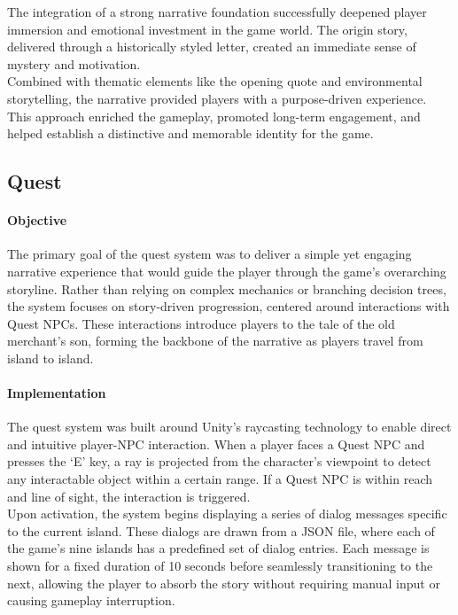 \documentclass{article}
\begin{document}
The integration of a strong narrative foundation successfully deepened player immersion and emotional investment in the game world. The origin story, delivered through a historically styled letter, created an immediate sense of mystery and motivation.\\

Combined with thematic elements like the opening quote and environmental storytelling, the narrative provided players with a purpose-driven experience. This approach enriched the gameplay, promoted long-term engagement, and helped establish a distinctive and memorable identity for the game.









\newpage
\subsection{Quest}
\paragraph{Objective}\hfill

The primary goal of the quest system was to deliver a simple yet engaging narrative experience that would guide the player through the game's overarching storyline. Rather than relying on complex mechanics or branching decision trees, the system focuses on story-driven progression, centered around interactions with Quest NPCs. These interactions introduce players to the tale of the old merchant's son, forming the backbone of the narrative as players travel from island to island.

\paragraph{Implementation}\hfill

The quest system was built around Unity's raycasting technology to enable direct and intuitive player-NPC interaction. When a player faces a Quest NPC and presses the ‘E' key, a ray is projected from the character's viewpoint to detect any interactable object within a certain range. If a Quest NPC is within reach and line of sight, the interaction is triggered.\\

Upon activation, the system begins displaying a series of dialog messages specific to the current island. These dialogs are drawn from a JSON file, where each of the game's nine islands has a predefined set of dialog entries. Each message is shown for a fixed duration of 10 seconds before seamlessly transitioning to the next, allowing the player to absorb the story without requiring manual input or causing gameplay interruption.\\
\end{document}
